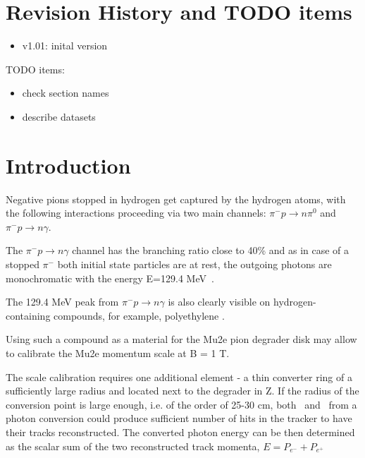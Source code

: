 \documentclass[12pt]{article}
\begin{document}
% 


\newpage
\section {Revision History and TODO items}

\begin{itemize}
\item
  v1.01: inital version
\end{itemize}

{\red
TODO items:

\begin{itemize}
\item
  check section names
\item
  describe datasets
\end{itemize}
}
\newpage
\section {Introduction}
Negative pions stopped in hydrogen get captured by the hydrogen atoms, 
with the following interactions proceeding via two main channels:
$\pi^- p \to n\pi^0$ and $\pi^- p \to n \gamma$.

The $\pi^- p \to n \gamma$ channel has the branching ratio close to 40\%
and as in case of a stopped $\pi^-$ both initial state particles are at rest,
the outgoing photons are monochromatic with the energy E=129.4 MeV~\cite{RPC_1972_Bistirlich_PhysRevC.5.1867}.

The 129.4 MeV peak from $\pi^- p \to n \gamma$ is also clearly visible on hydrogen-containing
compounds, for example, polyethylene \cite{RPC_1972_Bistirlich_PhysRevC.5.1867}.

Using such a compound as a material for the Mu2e pion degrader disk may allow to calibrate
the Mu2e momentum scale at B = 1 T.

The scale calibration requires one additional element - a thin converter ring
of a sufficiently large radius and located next to the degrader in Z.
If the radius of the conversion point is large enough, i.e. of the order of 25-30 cm,
both \eplus\ and \eminus\ from a photon conversion could produce sufficient
number of hits in the tracker to have their tracks reconstructed.
The converted photon energy can be then determined as the scalar sum
of the two reconstructed track momenta, $E = P_{e^-} + P_{e^+}$
\end{document}
